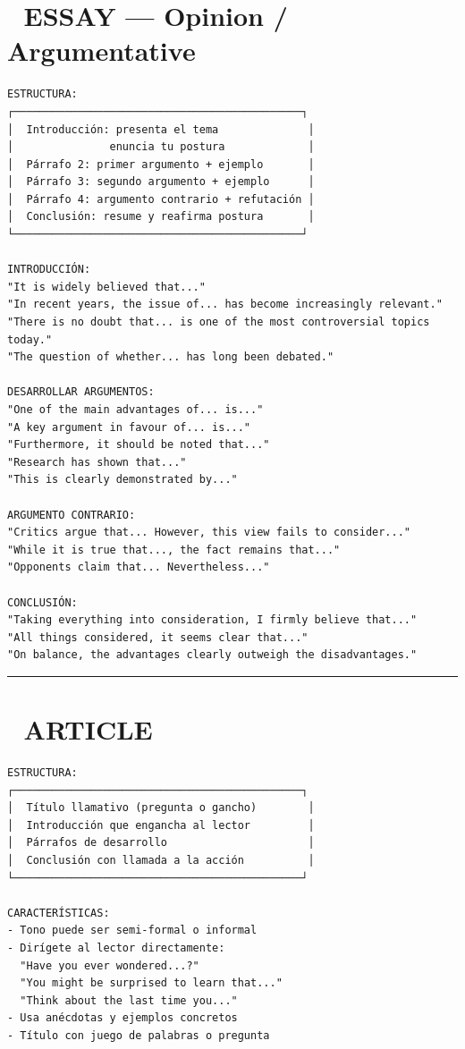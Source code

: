 \documentclass[
  spanish,
  letterpaper,
]{scrbook}
\begin{document}
\section{📰 ESSAY --- Opinion /
Argumentative}\label{essay-opinion-argumentative}

\begin{verbatim}
ESTRUCTURA:
┌─────────────────────────────────────────────┐
│  Introducción: presenta el tema              │
│               enuncia tu postura             │
│  Párrafo 2: primer argumento + ejemplo       │
│  Párrafo 3: segundo argumento + ejemplo      │
│  Párrafo 4: argumento contrario + refutación │
│  Conclusión: resume y reafirma postura       │
└─────────────────────────────────────────────┘

INTRODUCCIÓN:
"It is widely believed that..."
"In recent years, the issue of... has become increasingly relevant."
"There is no doubt that... is one of the most controversial topics today."
"The question of whether... has long been debated."

DESARROLLAR ARGUMENTOS:
"One of the main advantages of... is..."
"A key argument in favour of... is..."
"Furthermore, it should be noted that..."
"Research has shown that..."
"This is clearly demonstrated by..."

ARGUMENTO CONTRARIO:
"Critics argue that... However, this view fails to consider..."
"While it is true that..., the fact remains that..."
"Opponents claim that... Nevertheless..."

CONCLUSIÓN:
"Taking everything into consideration, I firmly believe that..."
"All things considered, it seems clear that..."
"On balance, the advantages clearly outweigh the disadvantages."
\end{verbatim}

\begin{center}\rule{0.5\linewidth}{0.5pt}\end{center}

\section{📖 ARTICLE}\label{article}

\begin{verbatim}
ESTRUCTURA:
┌─────────────────────────────────────────────┐
│  Título llamativo (pregunta o gancho)        │
│  Introducción que engancha al lector         │
│  Párrafos de desarrollo                      │
│  Conclusión con llamada a la acción          │
└─────────────────────────────────────────────┘

CARACTERÍSTICAS:
- Tono puede ser semi-formal o informal
- Dirígete al lector directamente:
  "Have you ever wondered...?"
  "You might be surprised to learn that..."
  "Think about the last time you..."
- Usa anécdotas y ejemplos concretos
- Título con juego de palabras o pregunta
\end{verbatim}
\end{document}

